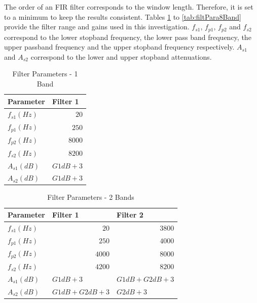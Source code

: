 \documentclass[12pt, onecolumn]{article}
\begin{document}
\begin{appendices}
\noindent The order of an FIR filter corresponds to the window length. Therefore, it is set to a minimum to keep the results consistent. Tables \ref{tab:filtPara1Band} to \ref{tab:filtPara8Band} provide the filter range and gains used in this investigation. $f_{s1}$, $f_{p1}$, $f_{p2}$ and $f_{s2}$ correspond to the lower stopband frequency, the lower pass band frequency, the upper passband frequency and the upper stopband frequency respectively. $A_{s1}$ and $A_{s2}$ correspond to the lower and upper stopband attenuations.

\begin{table}[htbp]
  \centering
  \caption{Filter Parameters - 1 Band}
    \begin{tabular}{|l|l|}
    \hline
    \textbf{Parameter} & \textbf{Filter 1} \\
    \hline
    $f_{s1} (Hz)$   & \multicolumn{1}{r|}{$20$} \\
    \hline
    $f_{p1} (Hz)$   & \multicolumn{1}{r|}{$250$} \\
    \hline
    $f_{p2} (Hz)$   & \multicolumn{1}{r|}{$8000$} \\
    \hline
    $f_{s2} (Hz)$   & \multicolumn{1}{r|}{$8200$} \\
    \hline
    $A_{s1} (dB)$   & $G1dB + 3$ \\
    \hline
    $A_{s2} (dB)$   & $G1dB + 3$ \\
    \hline
    \end{tabular}%
  \label{tab:filtPara1Band}%
\end{table}%


\begin{table}[htbp]
  \centering
  \caption{Filter Parameters - 2 Bands}
    \begin{tabular}{|l|l|l|}
    \hline
    \textbf{Parameter} & \textbf{Filter 1} & \textbf{Filter 2} \\
    \hline
    $f_{s1} (Hz)$   & \multicolumn{1}{r|}{$20$} & \multicolumn{1}{r|}{$ 3800$ } \\
    \hline
    $f_{p1} (Hz)$  & \multicolumn{1}{r|}{$250$} & \multicolumn{1}{r|}{$4000$} \\
    \hline
    $f_{p2} (Hz)$   & \multicolumn{1}{r|}{$ 4000$ } & \multicolumn{1}{r|}{$8000$} \\
    \hline
    $f_{s2} (Hz)$   & \multicolumn{1}{r|}{$ 4200$ } & \multicolumn{1}{r|}{$8200$} \\
    \hline
    $A_{s1} (dB)$   & $G1dB + 3$ & $G1dB + G2dB + 3$ \\
    \hline
    $A_{s2} (dB)$   & $G1dB + G2dB + 3$ & $G2dB + 3$ \\
    \hline
    \end{tabular}%
  \label{tab:filtPara2Band}%
\end{table}%


\end{appendices}
\end{document}
